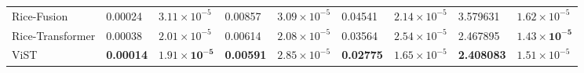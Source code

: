 \documentclass[acmsmall,manuscript, screen, review]{acmart}
\begin{document}
\begin{table}[htbp]
\begin{tabular}{lllllllll}
    Rice-Fusion & 0.00024 & \begin{math}3.11\times 10^{-5}\end{math} & 0.00857 & \begin{math}3.09\times 10^{-5}\end{math} & 0.04541 & \begin{math}2.14\times 10^{-5}\end{math} & 3.579631 & \begin{math}1.62\times 10^{-5}\end{math} \\
    Rice-Transformer & 0.00038 & \begin{math}2.01\times 10^{-5}\end{math} & 0.00614 & \begin{math}2.08\times 10^{-5}\end{math} & 0.03564 & \begin{math}2.54\times 10^{-5}\end{math} & 2.467895 & \begin{math}\mathbf{1.43\times 10^{-5}}\end{math} \\
    ViST  & \textbf{0.00014} & \begin{math}\mathbf{1.91\times 10^{-5}}\end{math} & \textbf{0.00591} & \begin{math}2.85\times 10^{-5}\end{math} & \textbf{0.02775} & \begin{math}1.65\times 10^{-5}\end{math} & \textbf{2.408083} & \begin{math}1.51\times 10^{-5}\end{math} \\
    \bottomrule
    \end{tabular}%
  \label{tab:hybrid_results}%
\end{table}%
\end{document}
